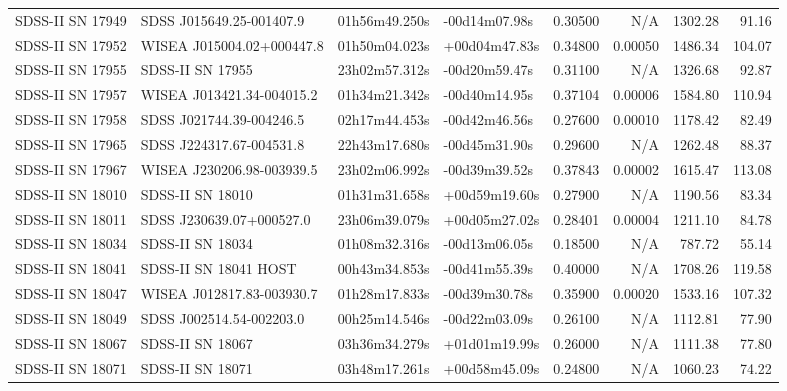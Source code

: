 \begin{longtable}{llllrrrr}
SDSS-II SN 17949 &        SDSS J015649.25-001407.9 &   01h56m49.250s &   -00d14m07.98s &  0.30500 &      N/A &  1302.28 &       91.16 \\
SDSS-II SN 17952 &       WISEA J015004.02+000447.8 &   01h50m04.023s &   +00d04m47.83s &  0.34800 &  0.00050 &  1486.34 &      104.07 \\
SDSS-II SN 17955 &                SDSS-II SN 17955 &   23h02m57.312s &   -00d20m59.47s &  0.31100 &      N/A &  1326.68 &       92.87 \\
SDSS-II SN 17957 &       WISEA J013421.34-004015.2 &   01h34m21.342s &   -00d40m14.95s &  0.37104 &  0.00006 &  1584.80 &      110.94 \\
SDSS-II SN 17958 &        SDSS J021744.39-004246.5 &   02h17m44.453s &   -00d42m46.56s &  0.27600 &  0.00010 &  1178.42 &       82.49 \\
SDSS-II SN 17965 &        SDSS J224317.67-004531.8 &   22h43m17.680s &   -00d45m31.90s &  0.29600 &      N/A &  1262.48 &       88.37 \\
SDSS-II SN 17967 &       WISEA J230206.98-003939.5 &   23h02m06.992s &   -00d39m39.52s &  0.37843 &  0.00002 &  1615.47 &      113.08 \\
SDSS-II SN 18010 &                SDSS-II SN 18010 &   01h31m31.658s &   +00d59m19.60s &  0.27900 &      N/A &  1190.56 &       83.34 \\
SDSS-II SN 18011 &        SDSS J230639.07+000527.0 &   23h06m39.079s &   +00d05m27.02s &  0.28401 &  0.00004 &  1211.10 &       84.78 \\
SDSS-II SN 18034 &                SDSS-II SN 18034 &   01h08m32.316s &   -00d13m06.05s &  0.18500 &      N/A &   787.72 &       55.14 \\
SDSS-II SN 18041 &           SDSS-II SN 18041 HOST &   00h43m34.853s &   -00d41m55.39s &  0.40000 &      N/A &  1708.26 &      119.58 \\
SDSS-II SN 18047 &       WISEA J012817.83-003930.7 &   01h28m17.833s &   -00d39m30.78s &  0.35900 &  0.00020 &  1533.16 &      107.32 \\
SDSS-II SN 18049 &        SDSS J002514.54-002203.0 &   00h25m14.546s &   -00d22m03.09s &  0.26100 &      N/A &  1112.81 &       77.90 \\
SDSS-II SN 18067 &                SDSS-II SN 18067 &   03h36m34.279s &   +01d01m19.99s &  0.26000 &      N/A &  1111.38 &       77.80 \\
SDSS-II SN 18071 &                SDSS-II SN 18071 &   03h48m17.261s &   +00d58m45.09s &  0.24800 &      N/A &  1060.23 &       74.22 \\

\end{longtable}
